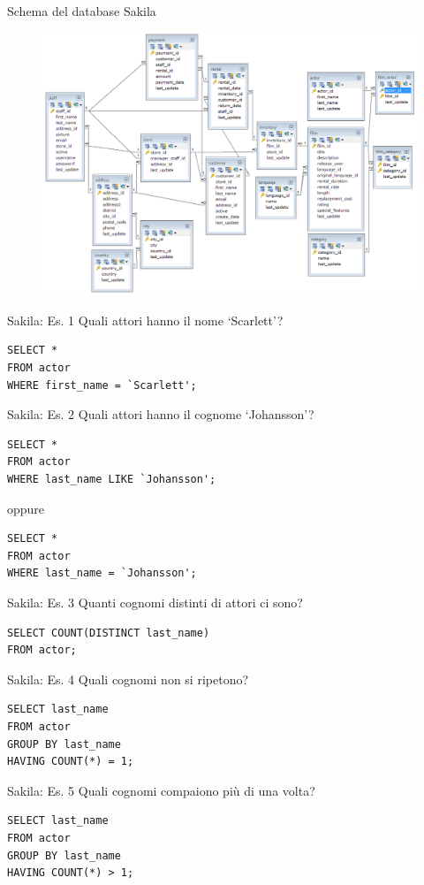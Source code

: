\begin{frame}[fragile]{Schema del database Sakila}
\begin{figure}
    \centering
        \includegraphics[width=.65\textwidth]{img/db-sakila.png}
    \end{figure}
\end{frame}
%
\begin{frame}[fragile]{Sakila: Es. 1}
Quali attori hanno il nome `Scarlett'?
\pause
\begin{lstlisting}
SELECT *
FROM actor
WHERE first_name = `Scarlett';
\end{lstlisting}
\end{frame}
%
\begin{frame}[fragile]{Sakila: Es. 2}
Quali attori hanno il cognome `Johansson'?
\pause
\begin{lstlisting}
SELECT *
FROM actor
WHERE last_name LIKE `Johansson';
\end{lstlisting}
\pause
oppure
\begin{lstlisting}
SELECT *
FROM actor
WHERE last_name = `Johansson';
\end{lstlisting}
\end{frame}
%
\begin{frame}[fragile]{Sakila: Es. 3}
Quanti cognomi distinti di attori ci sono?
\pause
\begin{lstlisting}
SELECT COUNT(DISTINCT last_name)
FROM actor;
\end{lstlisting}
\end{frame}
%
\begin{frame}[fragile]{Sakila: Es. 4}
Quali cognomi non si ripetono?
\pause
\begin{lstlisting}
SELECT last_name
FROM actor
GROUP BY last_name
HAVING COUNT(*) = 1;
\end{lstlisting}
\end{frame}
%
\begin{frame}[fragile]{Sakila: Es. 5}
Quali cognomi compaiono pi\`u di una volta?
\pause
\begin{lstlisting}
SELECT last_name
FROM actor
GROUP BY last_name
HAVING COUNT(*) > 1;
\end{lstlisting}
\end{frame}
